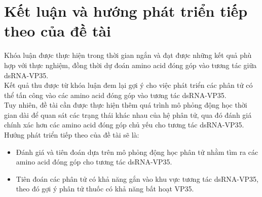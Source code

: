 \documentclass[12pt,a4paper,reqno, oneside]{book}
\begin{document}
\chapter{Kết luận và hướng phát triển tiếp theo của đề tài}
\hspace{18pt}
	
	
	Khóa luận được thực hiện trong thời gian ngắn và đạt được những kết quả phù hợp với thực nghiệm, đồng thời dự đoán amino acid đóng góp vào tương tác giữa dsRNA-VP35.\\ 
	Kết quả thu được từ khóa luận đem lại gợi ý cho việc phát triển các phân tử có thể tấn công vào các amino acid đóng góp vào tương tác dsRNA-VP35.\\
	Tuy nhiên, đề tài cần được thực hiện thêm quá trình mô phỏng động học thời gian dài để quan sát các trạng thái khác nhau của hệ phân tử, qua đó đánh giá chính xác hơn các amino acid đóng góp chủ yếu cho tương tác dsRNA-VP35.\\
	Hướng phát triển tiếp theo của đề tài sẽ là:
	\begin{itemize}
	\item Đánh giá và tiên đoán dựa trên mô phỏng động học phân tử nhằm tìm ra các amino acid đóng góp cho tương tác dsRNA-VP35.
	\item Tiên đoán các phân tử có khả năng gắn vào khu vực tương tác dsRNA-VP35, theo đó gợi ý phân tử thuốc có khả năng bất hoạt VP35.
	\end{itemize}
	


\printbibliography
{}
\clearpage





\appendix
{}
\clearpage
\newpage

\end{document}
